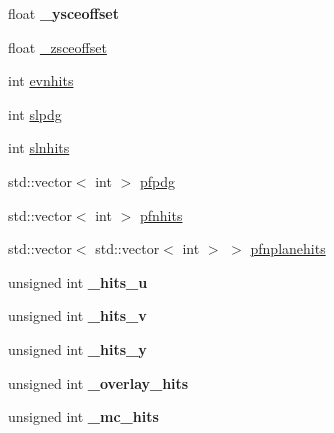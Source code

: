 \begin{DoxyCompactItemize}
\item 
\hypertarget{classanalysis_1_1DefaultAnalysis_aa3948474002486f07a07ff52f24976ce}{float {\bfseries \-\_\-ysceoffset}}\label{classanalysis_1_1DefaultAnalysis_aa3948474002486f07a07ff52f24976ce}

\item 
float \hyperlink{classanalysis_1_1DefaultAnalysis_af2471e0f1bf6cf3c5bec18f830f41c8d}{\-\_\-zsceoffset}
\item 
int \hyperlink{classanalysis_1_1DefaultAnalysis_a32911aea589477a3832a4de8d134696d}{evnhits}
\item 
int \hyperlink{classanalysis_1_1DefaultAnalysis_a9763429d7ed32c67e96d981d14893c06}{slpdg}
\item 
int \hyperlink{classanalysis_1_1DefaultAnalysis_a9f003b22425d9db3b27eabee64700028}{slnhits}
\item 
std\-::vector$<$ int $>$ \hyperlink{classanalysis_1_1DefaultAnalysis_a5d3ad6cd0930367cafe48e485aa19d20}{pfpdg}
\item 
std\-::vector$<$ int $>$ \hyperlink{classanalysis_1_1DefaultAnalysis_a8d010c569e35c153059a6db573b9542d}{pfnhits}
\item 
std\-::vector$<$ std\-::vector$<$ int $>$ $>$ \hyperlink{classanalysis_1_1DefaultAnalysis_a868edc3f02a7f71619edef7ee0d3df5c}{pfnplanehits}
\item 
\hypertarget{classanalysis_1_1DefaultAnalysis_a71d00d09f361b64c3b8491f1f83db0f9}{unsigned int {\bfseries \-\_\-hits\-\_\-u}}\label{classanalysis_1_1DefaultAnalysis_a71d00d09f361b64c3b8491f1f83db0f9}

\item 
\hypertarget{classanalysis_1_1DefaultAnalysis_a0d34f0785933a50dd9692651610b65c5}{unsigned int {\bfseries \-\_\-hits\-\_\-v}}\label{classanalysis_1_1DefaultAnalysis_a0d34f0785933a50dd9692651610b65c5}

\item 
\hypertarget{classanalysis_1_1DefaultAnalysis_a30b699a515887188545764f63babb58d}{unsigned int {\bfseries \-\_\-hits\-\_\-y}}\label{classanalysis_1_1DefaultAnalysis_a30b699a515887188545764f63babb58d}

\item 
\hypertarget{classanalysis_1_1DefaultAnalysis_aa4e3c702d047e53f6838d1655b12877a}{unsigned int {\bfseries \-\_\-overlay\-\_\-hits}}\label{classanalysis_1_1DefaultAnalysis_aa4e3c702d047e53f6838d1655b12877a}

\item 
\hypertarget{classanalysis_1_1DefaultAnalysis_aaaba27518c55c8797bbff0649cc48a8b}{unsigned int {\bfseries \-\_\-mc\-\_\-hits}}\label{classanalysis_1_1DefaultAnalysis_aaaba27518c55c8797bbff0649cc48a8b}


\end{DoxyCompactItemize}
